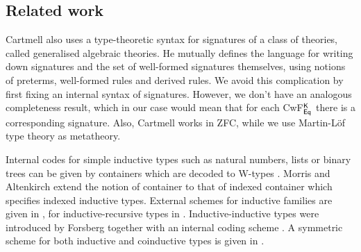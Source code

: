 \documentclass[acmsmall,review,anonymous]{acmart}\settopmatter{printfolios=true,printccs=false,printacmref=false}
\begin{document}

\subsection{Related work}
\label{sec:related-work}

Cartmell \cite{gat} also uses a type-theoretic syntax for signatures
of a class of theories, called generalised algebraic theories. He mutually
defines the language for writing down signatures and the set of
well-formed signatures themselves, using notions of preterms,
well-formed rules and derived rules. We avoid this complication by
first fixing an internal syntax of signatures. However, we don't have
an analogous completeness result, which in our case would mean that
for each CwF$^{\mathsf{K}}_{\mathsf{Eq}}$ there is a corresponding signature. Also,
Cartmell works in ZFC, while we use Martin-Löf type theory as
metatheory.

Internal codes for simple inductive types such as
natural numbers, lists or binary trees can be given by containers
which are decoded to W-types \cite{abbot05containers}. Morris and
Altenkirch \cite{morris09indexed} extend the notion of container to
that of indexed container which specifies indexed inductive
types. External schemes for inductive families are given in
\cite{Dybjer97inductivefamilies,paulinmohring}, for
inductive-recursive types in \cite{dybjer00ir}. Inductive-inductive
types were introduced by Forsberg together with an internal coding
scheme \cite{forsberg-phd}. A symmetric scheme for both inductive and
coinductive types is given in \cite{henning}.
\end{document}
